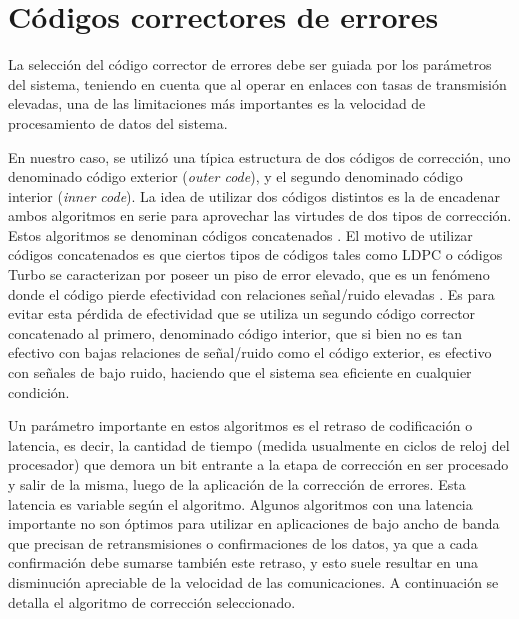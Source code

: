 \section{Códigos correctores de errores}

La selección del código corrector de errores debe ser guiada por los parámetros del sistema, teniendo en cuenta que al operar en enlaces con tasas de transmisión elevadas, una de las limitaciones más importantes es la velocidad de procesamiento de datos del sistema.

En nuestro caso, se utilizó una típica estructura de dos códigos de corrección, uno denominado código exterior (\textit{outer code}), y el segundo denominado código interior (\textit{inner code}).
La idea de utilizar dos códigos distintos es la de encadenar ambos algoritmos en serie para aprovechar las virtudes de dos tipos de corrección. Estos algoritmos se denominan códigos concatenados \cite{forney1966concatenated}. El motivo de utilizar códigos concatenados es que ciertos tipos de códigos tales como LDPC o códigos Turbo se caracterizan por poseer un piso de error elevado, que es un fenómeno donde el código pierde efectividad con relaciones señal/ruido elevadas \cite{richardson2003error}. Es para evitar esta pérdida de efectividad que se utiliza un segundo código corrector concatenado al primero, denominado código interior, que si bien no es tan efectivo con bajas relaciones de señal/ruido como el código exterior, es efectivo con señales de bajo ruido, haciendo que el sistema sea eficiente en cualquier condición.

Un parámetro importante en estos algoritmos es el retraso de codificación o latencia, es decir, la cantidad de tiempo (medida usualmente en ciclos de reloj del procesador) que demora un bit entrante a la etapa de corrección en ser procesado y salir de la misma, luego de la aplicación de la corrección de errores. Esta latencia es variable según el algoritmo. Algunos algoritmos con una latencia importante no son óptimos para utilizar en aplicaciones de bajo ancho de banda que precisan de retransmisiones o confirmaciones de los datos, ya que a cada confirmación debe sumarse también este retraso, y esto suele resultar en una disminución apreciable de la velocidad de las comunicaciones. A continuación se detalla el algoritmo de corrección seleccionado.

